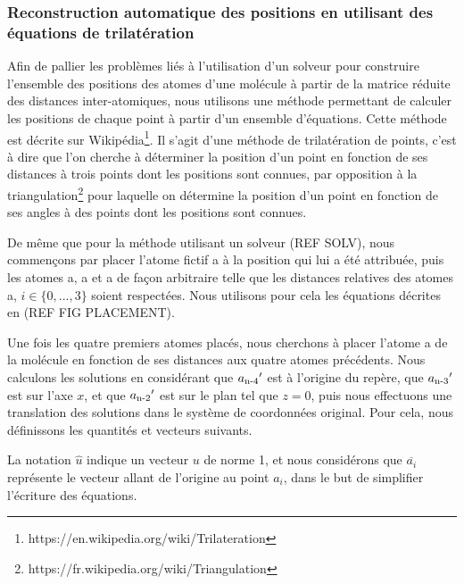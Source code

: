 \subsubsection{Reconstruction automatique des positions en utilisant des équations de trilatération}

\par Afin de pallier les problèmes liés à l'utilisation d'un solveur pour construire l'ensemble des positions des atomes d'une molécule à partir de la matrice réduite des distances inter-atomiques, nous utilisons une méthode permettant de calculer les positions de chaque point à partir d'un ensemble d'équations. Cette méthode est décrite sur Wikipédia\footnote{https://en.wikipedia.org/wiki/Trilateration}. Il s'agit d'une méthode de trilatération de points, c'est à dire que l'on cherche à déterminer la position d'un point en fonction de ses distances à trois points dont les positions sont connues, par opposition à la triangulation\footnote{https://fr.wikipedia.org/wiki/Triangulation} pour laquelle on détermine la position d'un point en fonction de ses angles à des points dont les positions sont connues.\\

\par De même que pour la méthode utilisant un solveur (REF SOLV), nous commençons par placer l'atome fictif a à la position qui lui a été attribuée, puis les atomes a, a et a de façon arbitraire telle que les distances relatives des atomes a, $i \in \{0, ..., 3\}$ soient respectées. Nous utilisons pour cela les équations décrites en (REF FIG PLACEMENT).\\

\par Une fois les quatre premiers atomes placés, nous cherchons à placer l'atome a de la molécule en fonction de ses distances aux quatre atomes précédents. Nous calculons les solutions en considérant que $a\textsubscript{n-4}'$ est à l'origine du repère, que $a\textsubscript{n-3}'$ est sur l'axe $x$, et que $a\textsubscript{n-2}'$ est sur le plan tel que $z=0$, puis nous effectuons une translation des solutions dans le système de coordonnées original. Pour cela, nous définissons les quantités et vecteurs suivants. 
\par La notation $\hat{u}$ indique un vecteur $u$ de norme 1, et nous considérons que $\overline{a_i}$ représente le vecteur allant de l'origine au point $a_i$, dans le but de simplifier l'écriture des équations.\\

